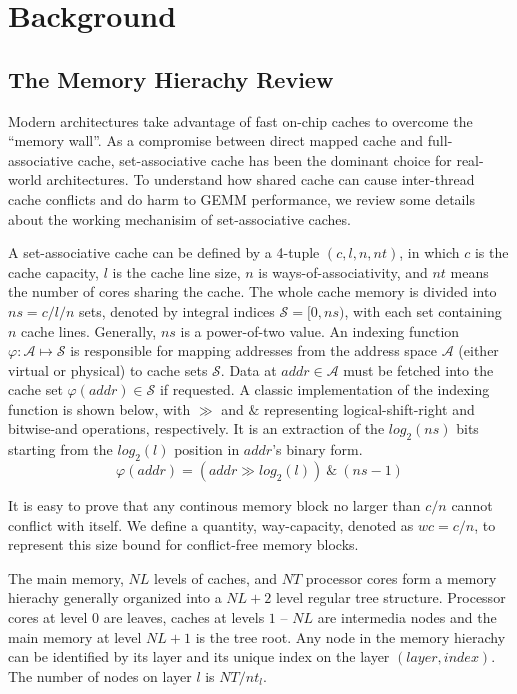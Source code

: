\section{Background}\label{sec:background}

\subsection{The Memory Hierachy Review}\label{subsec:hierachy}

Modern architectures take advantage of fast on-chip caches
to overcome the ``memory wall''.
As a compromise between direct mapped cache and full-associative cache,
set-associative cache has been the dominant choice for real-world architectures.
To understand how shared cache can cause inter-thread cache conflicts
and do harm to GEMM performance, we review some details
about the working mechanisim of set-associative caches.

A set-associative cache can be defined by a 4-tuple $(c, l, n, nt)$,
in which $c$ is the cache capacity, $l$ is the cache line size,
$n$ is ways-of-associativity,
and $nt$ means the number of cores sharing the cache.
The whole cache memory is divided into $ns=c/l/n$ sets,
denoted by integral indices $\mathcal{S} = [0, ns)$,
with each set containing $n$ cache lines.
Generally, $ns$ is a power-of-two value.
An indexing function $\varphi: \mathcal{A} \mapsto \mathcal{S}$ is responsible for
mapping addresses from the address space $\mathcal{A}$
(either virtual or physical) to cache sets $\mathcal{S}$.
Data at $addr \in \mathcal{A}$ must be fetched
into the cache set $\varphi(addr) \in \mathcal{S}$ if requested.
A classic implementation of the indexing function is shown below,
with $\gg$ and $\&$ representing logical-shift-right and bitwise-and operations, respectively.
It is an extraction of the $log_2(ns)$ bits starting from the $log_2(l)$
position in $addr$'s binary form.
\begin{equation*}
  \varphi(addr) = (addr \gg log_2(l)) ~\&~ (ns-1)
  \label{eq:phi}
\end{equation*}

It is easy to prove that any continous memory block no larger than $c/n$
cannot conflict with itself.
We define a quantity, way-capacity, denoted as $wc=c/n$,
to represent this size bound for conflict-free memory blocks.

The main memory, $NL$ levels of caches, and $NT$ processor cores
form a memory hierachy generally organized into
a $NL+2$ level regular tree structure.
Processor cores at level $0$ are leaves,
caches at levels $1$ -- $NL$ are intermedia nodes
and the main memory at level $NL+1$ is the tree root.
Any node in the memory hierachy can be identified by
its layer and its unique index on the layer $(layer, index)$.
The number of nodes on layer $l$ is $NT / nt_l$.

